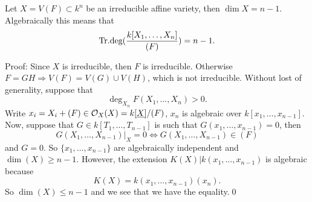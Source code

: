 \begin{dang}
\begin{proposition}\label{proposition: dimension of an irreducible affine variety in the affine space}
    Let $X=V(F)\subset k^n$ be an irreducible affine variety, then $\dim X = n-1$. Algebraically this means that 
    \begin{equation}
        \text{Tr.deg} (\frac{k[X_1,\dots,X_n]}{(F)}) = n-1.
    \end{equation}
\end{proposition}
\end{dang}
Proof: Since $X$ is irreducible, then $F$ is irreducible. Otherwise $F=GH\Rightarrow V(F)=V(G)\cup V(H)$, which is 
not irreducible. Without lost of generality, suppose that 
\begin{equation}
    \deg_{X_n}F(X_1,\dots, X_n)>0.
\end{equation}
Write $x_i = X_i + (F)\in \mathcal{O}_X(X)=k[\underline{X}]/(F)$, $x_n$ is algebraic over 
$k[x_1,\dots, x_{n-1}]$. Now, suppose that $G\in k[T_1,\dots, T_{n-1}]$ is such that 
$G(x_1,\dots,x_{n-1})=0$, then
\begin{equation}
    G(X_1,\dots,X_{n-1})|_X=0\iff G(X_1,\dots,X_{n-1})\in (F)
\end{equation}
and $G=0$. So $\{x_1,\dots,x_{n-1}\}$ are algebraically independent and $\dim(X)\geq n-1$. However, the extension 
$K(X)|k(x_1,\dots,x_{n-1})$ is algebraic because 
\begin{equation}
    K(X) = k(x_1,\dots,x_{n-1})(x_n).
\end{equation}
So $\dim(X)\leq n-1$ and we see that we have the equality.\qed 

